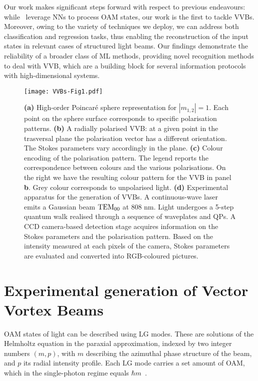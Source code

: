 Our work makes significant steps forward with respect to previous endeavours: while~\cite{krenn2014communication,krenn2016twisted,doster2017machine, park2018demultiplexing, lohani2018turbulence, li2018joint} leverage \acp{NN} to process \ac{OAM} states, our work is the first to tackle \acp{VVB}. Moreover, owing to the variety of techniques we deploy, we can address both classification and regression tasks, thus enabling the reconstruction of the input states in relevant cases of structured light beams.
Our findings demonstrate the reliability of a broader class of ML methods, providing novel recognition methods to deal with \ac{VVB}, which are a building block for several information protocols with high-dimensional systems.


\begin{figure}[tb]
	\centering
   \texttt{[image: VVBs-Fig1.pdf]}
    \caption{
    	\textbf{(a)} High-order Poincar\'e sphere representation for $|m_{1,2}|=1$. Each point on the sphere surface corresponds to specific polarisation patterns. 
	    \textbf{(b)} A radially polarised \ac{VVB}: at a given point in the trasversal plane the polarisation vector has a different orientation. The Stokes parameters vary accordingly in the plane.
	    \textbf{(c)} Colour encoding of the polarisation pattern. 
	    The legend reports the correspondence between colours and the various polarisations.
	    On the right we have the resulting colour pattern for the VVB in panel {\bf b}.
	    Grey colour corresponds to unpolarised light.
	    \textbf{(d)} Experimental apparatus for the generation of \acp{VVB}. A continuous-wave laser emits a Gaussian beam ${\rm TEM}_{00}$ at $808$ nm. Light undergoes a 5-step quantum walk realised through a sequence of waveplates and QPs.
    	A CCD camera-based detection stage acquires information on the Stokes parameters and the polarisation pattern. Based on the intensity measured at each pixels of the  camera, Stokes parameters are evaluated and converted into RGB-coloured pictures.
    }%
    \label{fig:VVBs:poinc_sphere}
\end{figure}


\section{Experimental generation of Vector Vortex Beams}

\acf{OAM} states of light can be described using \ac{LG} modes.
These are solutions of the Helmholtz equation in the paraxial approximation, indexed by two integer numbers $(m, p)$, with $m$ describing the azimuthal phase structure of the beam, and $p$ its radial intensity profile.
Each \ac{LG} mode carries a set amount of \ac{OAM}, which in the single-photon regime equals $\hbar m$~\cite{allen1992orbital}.

